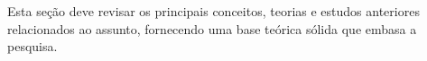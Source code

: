 Esta seção deve revisar os principais conceitos, teorias e estudos anteriores
relacionados ao assunto, fornecendo uma base teórica sólida que embasa a
pesquisa.
